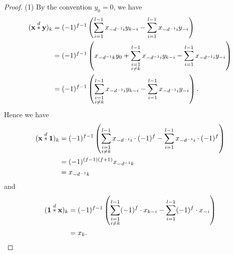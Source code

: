 \documentclass[a4paper, 11pt]{amsart}
\theoremstyle{plain}
\theoremstyle{definition}
\numberwithin{equation}{section}
\begin{document}
\begin{proof}
(1) By the convention $y_0=0$, we have
\begin{align*}
({\bf x}\overset{d}{\ast}{\bf y})_k &= (-1)^{f-1}\left( \sum_{i=1}^{l-1}x_{-d^{-1}i}y_{k-i} - \sum_{i=1}^{l-1}x_{-d^{-1}i}y_{-i} \right)\\
&=(-1)^{f-1}\left( x_{-d^{-1}k}y_0 + \sum_{\substack{i=1\\i\neq k}}^{l-1}x_{-d^{-1}i}y_{k-i} - \sum_{i=1}^{l-1}x_{-d^{-1}i}y_{-i} \right)\\
&=(-1)^{f-1}\left( \sum_{\substack{i=1\\i\neq k}}^{l-1}x_{-d^{-1}i}y_{k-i} - \sum_{i=1}^{l-1}x_{-d^{-1}i}y_{-i} \right).
\end{align*}
Hence we have
\begin{align*}
({\bf x}\overset{d}{\ast}{\bf 1})_k &=(-1)^{f-1}\left( \sum_{\substack{i=1\\i\neq k}}^{l-1}x_{-d^{-1}i}\cdot (-1)^{f} - \sum_{i=1}^{l-1}x_{-d^{-1}i}\cdot (-1)^{f} \right)\\
&=(-1)^{(f-1)(f+1)}x_{-d^{-1}k}\\
&=x_{-d^{-1}k}
\end{align*}
and
\begin{align*}
({\bf 1}\overset{d}{\ast}{\bf x})_k &=(-1)^{f-1}\left( \sum_{\substack{i=1\\i\neq k}}^{l-1}(-1)^{f}\cdot x_{k-i} - \sum_{i=1}^{l-1}(-1)^{f}\cdot x_{-i} \right)\\
&=x_{k}.
\end{align*}


\end{proof}
\end{document}
